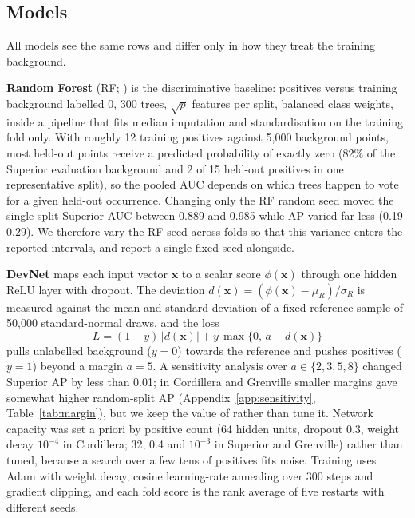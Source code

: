\documentclass[pdflatex,sn-apa]{sn-jnl}
\begin{document}
\subsection{Models}\label{sec:models}

All models see the same rows and differ only in how they treat the training background.

\textbf{Random Forest} (RF; \citealp{Breiman2001}) is the discriminative baseline: positives versus training background labelled 0, 300 trees, $\sqrt{p}$ features per split, balanced class weights, inside a pipeline that fits median imputation and standardisation on the training fold only. With roughly 12 training positives against 5,000 background points, most held-out points receive a predicted probability of exactly zero (82\% of the Superior evaluation background and 2 of 15 held-out positives in one representative split), so the pooled AUC depends on which trees happen to vote for a given held-out occurrence. Changing only the RF random seed moved the single-split Superior AUC between 0.889 and 0.985 while AP varied far less (0.19--0.29). We therefore vary the RF seed across folds so that this variance enters the reported intervals, and report a single fixed seed alongside.

\textbf{DevNet} \citep{Pang2019} maps each input vector $\mathbf{x}$ to a scalar score $\phi(\mathbf{x})$ through one hidden ReLU layer with dropout. The deviation $d(\mathbf{x}) = (\phi(\mathbf{x}) - \mu_R)/\sigma_R$ is measured against the mean and standard deviation of a fixed reference sample of 50,000 standard-normal draws, and the loss
\begin{equation}
L = (1-y)\,|d(\mathbf{x})| + y\,\max\{0,\, a - d(\mathbf{x})\}
\end{equation}
pulls unlabelled background ($y=0$) towards the reference and pushes positives ($y=1$) beyond a margin $a = 5$. A sensitivity analysis over $a \in \{2,3,5,8\}$ changed Superior AP by less than 0.01; in Cordillera and Grenville smaller margins gave somewhat higher random-split AP (Appendix~\ref{app:sensitivity}, Table~\ref{tab:margin}), but we keep the value of \citet{Pang2019} rather than tune it. Network capacity was set a priori by positive count (64 hidden units, dropout 0.3, weight decay $10^{-4}$ in Cordillera; 32, 0.4 and $10^{-3}$ in Superior and Grenville) rather than tuned, because a search over a few tens of positives fits noise. Training uses Adam \citep{Kingma2014} with weight decay, cosine learning-rate annealing over 300 steps and gradient clipping, and each fold score is the rank average of five restarts with different seeds.
\end{document}
